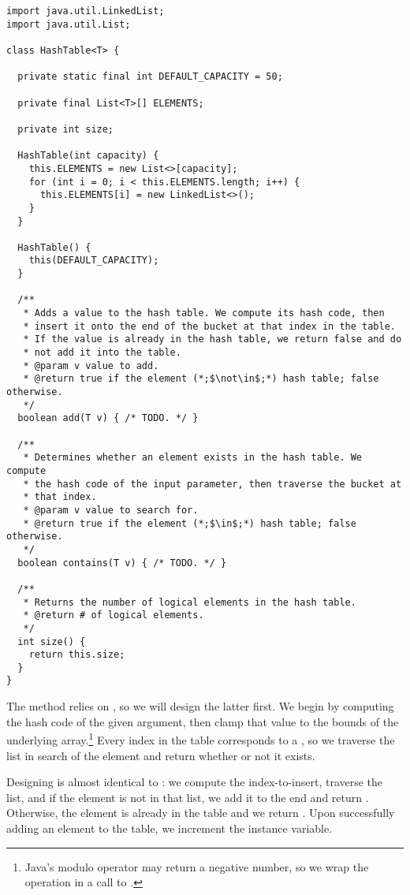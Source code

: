 \begin{lstlisting}[language=MyJava]
import java.util.LinkedList;
import java.util.List;

class HashTable<T> {

  private static final int DEFAULT_CAPACITY = 50;

  private final List<T>[] ELEMENTS;

  private int size;

  HashTable(int capacity) {
    this.ELEMENTS = new List<>[capacity];
    for (int i = 0; i < this.ELEMENTS.length; i++) {
      this.ELEMENTS[i] = new LinkedList<>();
    }
  }

  HashTable() { 
    this(DEFAULT_CAPACITY); 
  }

  /**
   * Adds a value to the hash table. We compute its hash code, then 
   * insert it onto the end of the bucket at that index in the table. 
   * If the value is already in the hash table, we return false and do 
   * not add it into the table.
   * @param v value to add.
   * @return true if the element (*;$\not\in$;*) hash table; false otherwise.
   */
  boolean add(T v) { /* TODO. */ }

  /**
   * Determines whether an element exists in the hash table. We compute 
   * the hash code of the input parameter, then traverse the bucket at 
   * that index.
   * @param v value to search for.
   * @return true if the element (*;$\in$;*) hash table; false otherwise.
   */
  boolean contains(T v) { /* TODO. */ }

  /**
   * Returns the number of logical elements in the hash table.
   * @return # of logical elements.
   */
  int size() { 
    return this.size; 
  }
}
\end{lstlisting}

The  method relies on , so we will design the latter first. We begin by computing the hash code of the given argument, then clamp that value to the bounds of the underlying array.\footnote{Java's modulo operator may return a negative number, so we wrap the operation in a call to .} Every index in the table corresponds to a , so we traverse the list in search of the element and return whether or not it exists.

Designing  is almost identical to : we compute the index-to-insert, traverse the list, and if the element is not in that list, we add it to the end and return . Otherwise, the element is already in the table and we return . Upon successfully adding an element to the table, we increment the  instance variable.

